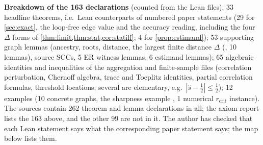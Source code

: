 \textbf{Breakdown of the 163 declarations} (counted from the Lean files):
33 headline theorems, i.e.\ Lean counterparts of numbered paper statements
(29 for \cref{sec:exact}, the loop-free edge value and the accuracy reading,
including the four $\Delta$ forms of \cref{thm:limit,thm:stat,cor:statiff}; 4
for \cref{prop:estimand}); 53 supporting graph lemmas (ancestry, roots, distance,
the largest finite distance $\Delta$ (, 10 lemmas), source SCCs,
5 ER witness lemmas, 6 estimand lemmas); 65 algebraic identities
and inequalities of the aggregation and finite-sample files (correlation
perturbation, Chernoff algebra, trace and Toeplitz identities, partial
correlation formulas, threshold locations; several are elementary, e.g.\
$|\hat s-\tfrac12|\le\tfrac12$); 12 examples (10 concrete graphs, the sharpness
example \lname{edgeLoops_burn_sharp}, 1 numerical $r_{\mathrm{crit}}$ instance).
The sources contain 262 theorem and lemma declarations in all; the axiom
report lists the 163 above, and the other 99 are not in it. The author has
checked that each Lean statement says what the corresponding paper statement
says; the map below lists them.

